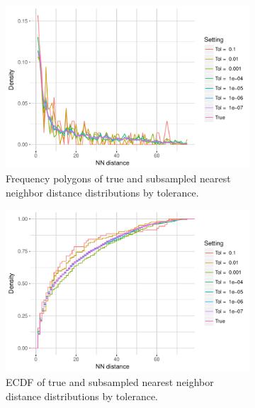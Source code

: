 \documentclass{article}
\begin{document}
\begin{figure}
    \begin{subfigure}{.49\textwidth}
        \includegraphics[width=\linewidth]{Figures/NearestNeighbor/Sequence/freqpoly_by_tol.pdf}
   		\caption{Frequency polygons of true and subsampled nearest neighbor distance distributions by tolerance.}
    	\label{fig:NNFreqPolySequence}
    \end{subfigure}
    \begin{subfigure}{.49\textwidth}
        \includegraphics[width=\linewidth]{Figures/NearestNeighbor/Sequence/ecdf_by_tol.pdf}
    	\caption{ECDF of true and subsampled nearest neighbor distance distributions by tolerance.}
    	\label{fig:NNECDFSequence}
    \end{subfigure}
    \begin{subfigure}{.49\textwidth}

\end{subfigure}
\end{figure}
\end{document}
